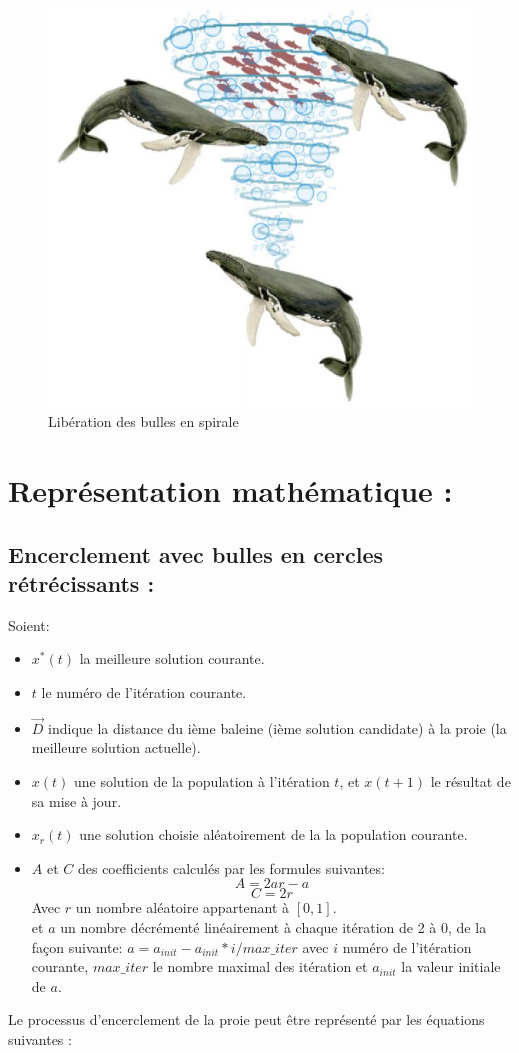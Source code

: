 \documentclass[12pt]{article}
\begin{document}
\begin{figure}[H] 
    \includegraphics[width=\linewidth]{../figures/spiral.png}
    \caption{Libération des bulles en spirale}
\end{figure}

\section{Représentation mathématique :}
\subsection{Encerclement avec bulles en cercles rétrécissants :}
Soient:
\begin{itemize}
    \item \(x^*(t)\) la meilleure solution courante.
    \item \(t\) le numéro de l'itération courante.
    \item \(\vec{D}\) indique la distance du ième baleine (ième solution candidate) à la proie (la meilleure solution actuelle).
    \item \(x(t)\) une solution de la population à l'itération \(t\), et \(x(t+1)\) le résultat de sa mise à jour.
    \item \(x_r(t)\) une solution choisie aléatoirement de la la population courante.
    \item \(A\) et \(C\) des coefficients calculés par les formules suivantes:
    \[A = 2ar-a\] 
    \[C = 2r\] 
    Avec \(r\) un nombre aléatoire appartenant à \([0,1]\).
    \\ et \(a\) un nombre décrémenté linéairement à chaque itération de 2 à 0, de la façon suivante:
    \(a =  a_{init} - a_{init}*i/max\_iter\) avec \(i\) numéro de l’itération courante, \(max\_iter\) le nombre maximal des itération et \(a_{init}\) la valeur initiale de \(a\).
\end{itemize}
Le processus d’encerclement de la proie peut être représenté par les équations suivantes :
\end{document}
